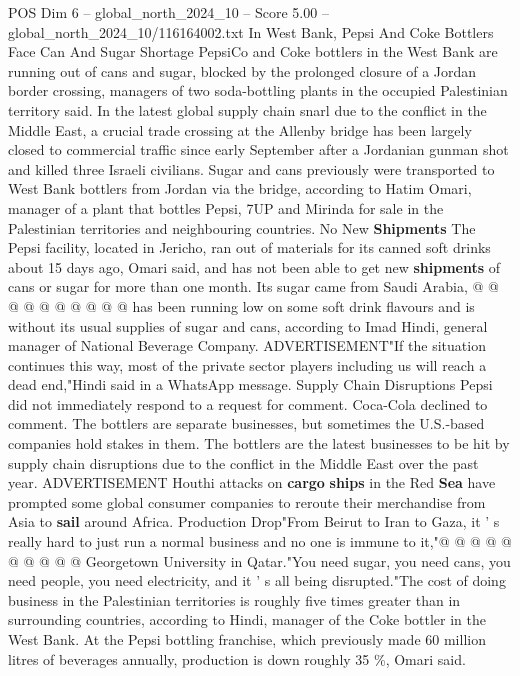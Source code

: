 \begin{textsample}{POS Dim 6 – global\_north\_2024\_10 – Score 5.00 – global\_north\_2024\_10/116164002.txt}  \label{ex:f6_pos_374}
In West Bank, Pepsi And Coke Bottlers Face Can And Sugar Shortage PepsiCo and Coke bottlers in the West Bank are running out of cans and sugar, blocked by the prolonged closure of a Jordan border crossing, managers of two soda-bottling plants in the occupied Palestinian territory said.
In the latest global supply chain snarl due to the conflict in the Middle East, a crucial trade crossing at the Allenby bridge has been largely closed to commercial traffic since early September after a Jordanian gunman shot and killed three Israeli civilians.
Sugar and cans previously were transported to West Bank bottlers from Jordan via the bridge, according to Hatim Omari, manager of a plant that bottles Pepsi, 7UP and Mirinda for sale in the Palestinian territories and neighbouring countries.
No New \textbf{Shipments} The Pepsi facility, located in Jericho, ran out of materials for its canned soft drinks about 15 days ago, Omari said, and has not been able to get new \textbf{shipments} of cans or sugar for more than one month.
Its sugar came from Saudi Arabia, @ @ @ @ @ @ @ @ @ @ has been running low on some soft drink flavours and is without its usual supplies of sugar and cans, according to Imad Hindi, general manager of National Beverage Company.
ADVERTISEMENT"If the situation continues this way, most of the private sector players including us will reach a dead end,"Hindi said in a WhatsApp message.
Supply Chain Disruptions Pepsi did not immediately respond to a request for comment.
Coca-Cola declined to comment.
The bottlers are separate businesses, but sometimes the U.S.-based companies hold stakes in them.
The bottlers are the latest businesses to be hit by supply chain disruptions due to the conflict in the Middle East over the past year.
ADVERTISEMENT Houthi attacks on \textbf{cargo} \textbf{ships} in the Red \textbf{Sea} have prompted some global consumer companies to reroute their merchandise from Asia to \textbf{sail} around Africa.
Production Drop"From Beirut to Iran to Gaza, it ' s really hard to just run a normal business and no one is immune to it,"@ @ @ @ @ @ @ @ @ @ Georgetown University in Qatar."You need sugar, you need cans, you need people, you need electricity, and it ' s all being disrupted."The cost of doing business in the Palestinian territories is roughly five times greater than in surrounding countries, according to Hindi, manager of the Coke bottler in the West Bank.
At the Pepsi bottling franchise, which previously made 60 million litres of beverages annually, production is down roughly 35 \%, Omari said.

\end{textsample}
